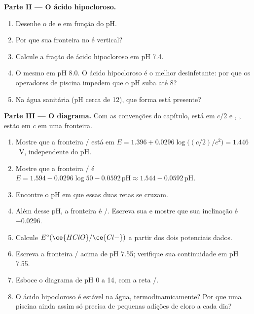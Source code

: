 \begin{problem}
\medskip
\noindent\textbf{Parte II --- O ácido hipocloroso.}
\begin{enumerate}[resume]
  \item Desenhe o  de  e  em
        função do pH.
  \item Por que sua fronteira no  é vertical?
  \item Calcule a fração de ácido hipocloroso em pH 7.4.
  \item O mesmo em pH 8.0. O ácido hipocloroso é o melhor desinfetante:
        por que os operadores de piscina impedem que o pH suba até 8?
  \item Na água sanitária (pH cerca de 12), que forma está presente?
\end{enumerate}

\medskip
\noindent\textbf{Parte III --- O diagrama.}
Com as convenções do capítulo,  está em $c/2$ e
, ,  estão em $c$ em uma fronteira.
\begin{enumerate}[resume]
  \item Mostre que a fronteira / está em $E = 1.396 +
        0.0296\log\bigl((c/2)/c^2\bigr) = 1.446$~V, independente do pH.
  \item Mostre que a fronteira / é $E = 1.594 -
        0.0296\log 50 - 0.0592\,\mathrm{pH} \approx 1.544 -
        0.0592\,\mathrm{pH}$.
  \item Encontre o pH em que essas duas retas se cruzam.
  \item Além desse pH, a fronteira é /. Escreva sua
         e mostre que sua inclinação é $-0.0296$.
  \item Calcule $E^\circ(\ce{HClO}/\ce{Cl-})$ a partir dos dois potenciais
        dados.
  \item Escreva a fronteira / acima de pH 7.55; verifique
        sua continuidade em pH 7.55.
  \item Esboce o diagrama de pH 0 a 14, com a reta /.
  \item O ácido hipocloroso é estável na água, termodinamicamente? Por
        que uma piscina ainda assim só precisa de pequenas adições de
        cloro a cada dia?
\end{enumerate}


\end{problem}
